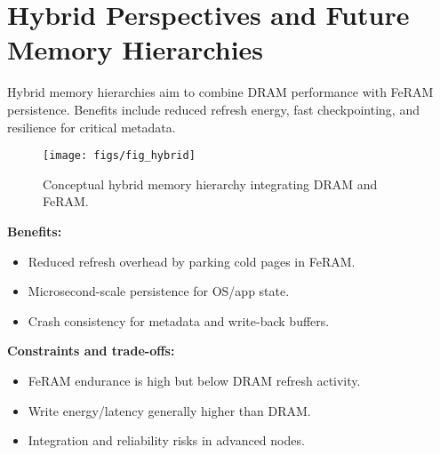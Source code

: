 \section{Hybrid Perspectives and Future Memory Hierarchies}

Hybrid memory hierarchies aim to combine DRAM performance with FeRAM persistence. Benefits include reduced refresh energy, fast checkpointing, and resilience for critical metadata.

\begin{figure}[!t]
  \centering
  \texttt{[image: figs/fig\_hybrid]}
  \caption{Conceptual hybrid memory hierarchy integrating DRAM and FeRAM.}
  \label{fig:hybrid_hierarchy}
\end{figure}

\textbf{Benefits:}
\begin{itemize}
  \item Reduced refresh overhead by parking cold pages in FeRAM.
  \item Microsecond-scale persistence for OS/app state.
  \item Crash consistency for metadata and write-back buffers.
\end{itemize}

\textbf{Constraints and trade-offs:}
\begin{itemize}
  \item FeRAM endurance is high but below DRAM refresh activity.
  \item Write energy/latency generally higher than DRAM.
  \item Integration and reliability risks in advanced nodes.
\end{itemize}

